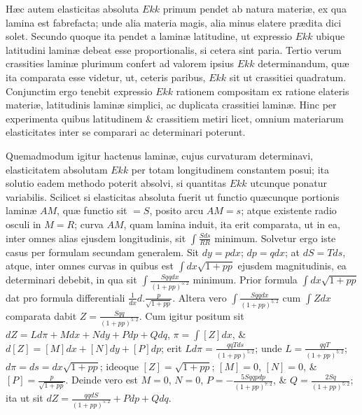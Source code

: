 Hæc autem elasticitas absoluta $Ekk$ primum pendet ab natura materiæ, ex qua lamina est fabrefacta; unde alia materia magis, alia minus elatere prædita dici solet. Secundo quoque ita pendet a laminæ latitudine, ut expressio $Ekk$ ubique latitudini laminæ debeat esse proportionalis, si cetera sint paria. Tertio verum crassities laminæ plurimum confert ad valorem ipsius $Ekk$ determinandum, quæ ita comparata esse videtur, ut, ceteris paribus, $Ekk$ sit ut crassitiei quadratum. Conjunctim ergo tenebit expressio $Ekk$ rationem compositam ex ratione elateris materiæ, latitudinis laminæ simplici, ac duplicata crassitiei laminæ. Hinc per experimenta quibus latitudinem \& crassitiem metiri licet, omnium materiarum elasticitates inter se comparari ac determinari poterunt.

Quemadmodum igitur hactenus laminæ, cujus curvaturam determinavi, elasticitatem absolutam $Ekk$ per totam longitudinem constantem posui; ita solutio eadem methodo poterit absolvi, si quantitas $Ekk$ utcunque ponatur variabilis. Scilicet si elasticitas absoluta fuerit ut functio quæcunque portionis laminæ $AM$, quæ functio sit $=S$, posito arcu $AM=s$; atque existente radio osculi in $M=R$; curva $AM$, quam lamina induit, ita erit comparata, ut in ea, inter omnes alias ejusdem longitudinis, sit $\int\frac{Sds}{RR}$ minimum. Solvetur ergo iste casus per formulam secundam generalem. Sit $dy=pdx$; $dp=qdx$; at $dS=Tds$, atque, inter omnes curvas in quibus est $\int dx\sqrt{1+pp}$ ejusdem magnitudinis, ea determinari debebit, in qua sit $\int\frac{Sqqdx}{(1+pp)^{5:2}}$ minimum. Prior formula $\int dx\sqrt{1+pp}$ dat pro formula differentiali $\frac1{dx}d.\frac p{\sqrt{1+pp}}$. Altera vero $\int\frac{Sqqdx}{(1+pp)^{5:2}}$ cum $\int Zdx$ comparata dabit $Z=\frac{Sqq}{(1+pp)^{5:2}}$. Cum igitur positum sit $dZ=Ld\pi+Mdx+Ndy+Pdp+Qdq$, $\pi=\int[Z]dx$, \& $d[Z]=[M]dx+[N]dy+[P]dp$; erit $Ld\pi=\frac{qqTds}{(1+pp)^{5:2}}$; unde $L=\frac{qqT}{(1+pp)^{5:2}}$; $d\pi=ds=dx\sqrt{1+pp}$; ideoque $[Z]=\sqrt{1+pp}$; $[M]=0$, $[N]=0$, \& $[P]=\frac p{\sqrt{1+pp}}$. Deinde vero est $M=0$, $N=0$, $P=-\frac{5Sqqpdp}{(1+pp)^{7:2}}$, \& $Q=\frac{2Sq}{(1+pp)^{5:2}}$; ita ut sit $dZ=\frac{qqdS}{(1+pp)^{5:2}}+Pdp+Qdq$.

